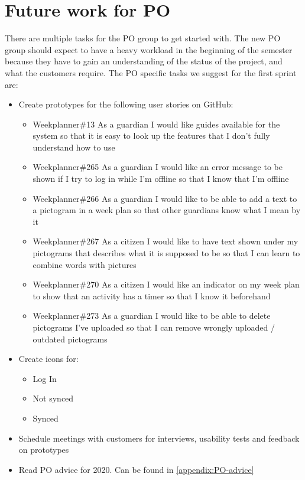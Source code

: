 \section{Future work for PO}
There are multiple tasks for the PO group to get started with.
The new PO group should expect to have a heavy workload in the beginning of the semester because they have to gain an understanding of the status of the project, and what the customers require.
The PO specific tasks we suggest for the first sprint are:

\begin{itemize}
    \item Create prototypes for the following user stories on GitHub:
    \begin{itemize}
        \item Weekplanner\#13 As a guardian I would like guides available for the system so that it is easy to look up the features that I don't fully understand how to use
        \item Weekplanner\#265 As a guardian I would like an error message to be shown if I try to log in while I'm offline so that I know that I'm offline
        \item Weekplanner\#266 As a guardian I would like to be able to add a text to a pictogram in a week plan so that other guardians know what I mean by it
        \item Weekplanner\#267 As a citizen I would like to have text shown under my pictograms that describes what it is supposed to be so that I can learn to combine words with pictures 
        \item Weekplanner\#270 As a citizen I would like an indicator on my week plan to show that an activity has a timer so that I know it beforehand
        \item Weekplanner\#273 As a guardian I would like to be able to delete pictograms I've uploaded so that I can remove wrongly uploaded / outdated pictograms 
    \end{itemize}
    \item Create icons for:
    \begin{itemize}
        \item Log In
        \item Not synced
        \item Synced
    \end{itemize}
    \item Schedule meetings with customers for interviews, usability tests and feedback on prototypes
    \item Read PO advice for 2020. Can be found in \autoref{appendix:PO-advice}
\end{itemize}
